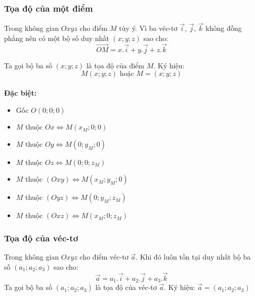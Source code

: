 \subsubsection*{Tọa độ của một điểm}
Trong không gian $Oxyz$ cho điểm $M$ tùy ý. Vì ba véc-tơ $\overrightarrow{i}$, $\overrightarrow{j}$, $\overrightarrow{k}$ không đồng phẳng nên có một bộ số duy nhất $(x; y; z)$ sao cho:
$$\boxed{\vec{OM}=x.\vec{i}+y.\vec{j}+z.\vec{k}}$$
\begin{center}
\end{center}
Ta gọi bộ ba số $\left(x;y;z\right)$ là tọa độ của điểm $M$. Ký hiệu: 
$$\boxed{M\left(x;y;z\right)\text{ hoặc }M=(x;y;z)}$$\\
\textbf{Đặc biệt:}
	\begin{itemize}
		\item Gốc $O\left(0;0;0\right)$ 
		\item $M$ thuộc $Ox\Leftrightarrow M\left(x_M;0;0\right)$
		\item $M$ thuộc $Oy\Leftrightarrow M\left(0;y_M;0\right)$
		\item $M$ thuộc $Oz\Leftrightarrow M\left(0;0;z_M\right)$
		\item $M$ thuộc $\left(Oxy\right)\Leftrightarrow M\left(x_M;y_M;0\right)$
		\item $M$ thuộc $\left(Oyz\right)\Leftrightarrow M\left(0;y_M;z_M\right)$
		\item $M$ thuộc $\left(Oxz\right)\Leftrightarrow M\left(x_M;0;z_M\right)$
	\end{itemize}

\subsubsection*{Tọa độ của véc-tơ}
Trong không gian $Oxyz$ cho điểm véc-tơ $\overrightarrow{a}$. Khi đó luôn tồn tại duy nhất bộ ba số $\left(a_1;a_2;a_3\right)$ sao cho:   
$$\vec{a}=a_1.\vec{i}+a_2.\vec{j}+a_3.\vec{k}$$ 
Ta gọi bộ ba số $\left(a_1;a_2;a_3\right)$ là tọa độ của véc-tơ $\overrightarrow{a}$. Ký hiệu: 
$\vec{a}=\left(a_1;a_2;a_3\right)$\\


